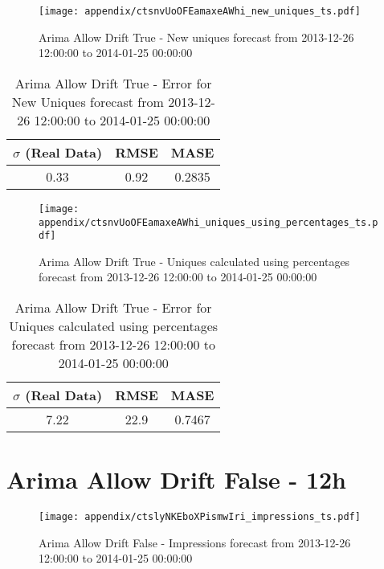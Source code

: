 \begin{figure}[H] \begin{center} \leavevmode
\texttt{[image: appendix/ctsnvUoOFEamaxeAWhi\_new\_uniques\_ts.pdf]} \caption[]{
Arima Allow Drift True - New uniques forecast from 2013-12-26 12:00:00 to 2014-01-25 00:00:00} \label{fig:appendix/ctsnvUoOFEamaxeAWhi_new_uniques_ts.pdf} \end{center}
\end{figure}

\begin{table}[H]
\centering
\footnotesize
\begin{tabular}{ccc}
$\sigma$ (Real Data) & RMSE & MASE   \\ \hline
0.33 & 0.92 & 0.2835 \\
\end{tabular}

\vspace{0.5cm}

\caption[]{
Arima Allow Drift True - Error for New Uniques forecast from 2013-12-26 12:00:00 to 2014-01-25 00:00:00}
\end{table}

\begin{figure}[H] \begin{center} \leavevmode
\texttt{[image: appendix/ctsnvUoOFEamaxeAWhi\_uniques\_using\_percentages\_ts.pdf]} \caption[]{
Arima Allow Drift True - Uniques calculated using percentages forecast from 2013-12-26 12:00:00 to 2014-01-25 00:00:00} \label{fig:appendix/ctsnvUoOFEamaxeAWhi_uniques_using_percentages_ts.pdf} \end{center}
\end{figure}

\begin{table}[H]
\centering
\footnotesize
\begin{tabular}{ccc}
$\sigma$ (Real Data) & RMSE & MASE   \\ \hline
7.22 & 22.9 & 0.7467 \\
\end{tabular}

\vspace{0.5cm}

\caption[]{
Arima Allow Drift True - Error for Uniques calculated using percentages forecast from 2013-12-26 12:00:00 to 2014-01-25 00:00:00}
\end{table}

\section{Arima Allow Drift False - 12h}
\begin{figure}[H] \begin{center} \leavevmode
\texttt{[image: appendix/ctslyNKEboXPismwIri\_impressions\_ts.pdf]} \caption[]{
Arima Allow Drift False - Impressions forecast from 2013-12-26 12:00:00 to 2014-01-25 00:00:00} \label{fig:appendix/ctslyNKEboXPismwIri_impressions_ts.pdf} \end{center}
\end{figure}

